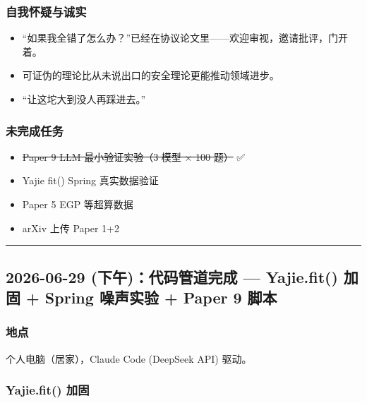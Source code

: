 \documentclass[
  12pt,
]{ctexart}
\providecommand{\tightlist}{%
  \setlength{\itemsep}{0pt}\setlength{\parskip}{0pt}}
\begin{document}
\subsubsection{自我怀疑与诚实}\label{ux81eaux6211ux6000ux7591ux4e0eux8bdaux5b9e}

\begin{itemize}
\tightlist
\item
  ``如果我全错了怎么办？''已经在协议论文里------欢迎审视，邀请批评，门开着。
\item
  可证伪的理论比从未说出口的安全理论更能推动领域进步。
\item
  ``让这坨大到没人再踩进去。''
\end{itemize}

\subsubsection{未完成任务}\label{ux672aux5b8cux6210ux4efbux52a1}

\begin{itemize}
\tightlist
\item
  \st{Paper 9 LLM 最小验证实验（3 模型 × 100 题）} ✅
\item
  Yajie fit() Spring 真实数据验证
\item
  Paper 5 EGP 等超算数据
\item
  arXiv 上传 Paper 1+2
\end{itemize}

\begin{center}\rule{0.5\linewidth}{0.5pt}\end{center}

\subsection{2026-06-29 (下午)：代码管道完成 --- Yajie.fit() 加固 +
Spring 噪声实验 + Paper 9
脚本}\label{ux4e0bux5348ux4ee3ux7801ux7ba1ux9053ux5b8cux6210-yajie.fit-ux52a0ux56fa-spring-ux566aux58f0ux5b9eux9a8c-paper-9-ux811aux672c}

\subsubsection{地点}\label{ux5730ux70b9-3}

个人电脑（居家），Claude Code (DeepSeek API) 驱动。

\subsubsection{Yajie.fit() 加固}\label{yajie.fit-ux52a0ux56fa}
\end{document}
